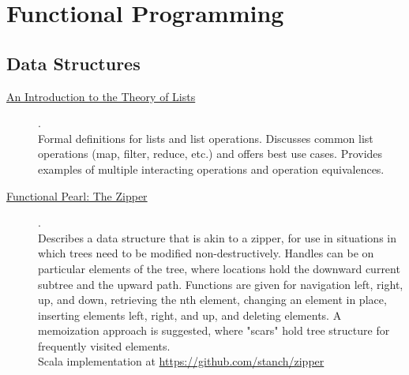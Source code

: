 \chapter {Functional Programming}

\section{Data Structures}

\begin{description}
    \item[\href{https://www.cs.ox.ac.uk/files/3378/PRG56.pdf}{An Introduction to the Theory of Lists}] {\cite{bird1987introduction}.
          \\ Formal definitions for lists and list operations. Discusses common list operations (map, filter, reduce, etc.) and offers best use cases. Provides examples of multiple interacting operations and operation equivalences.
          \\ }
    \item[\href{https://www.st.cs.uni-saarland.de/edu/seminare/2005/advanced-fp/docs/huet-zipper.pdf}{Functional Pearl: The Zipper}] {\cite{huet1997zipper}.
          \\ Describes a data structure that is akin to a zipper, for use in situations in which trees need to be modified non-destructively. Handles can be on particular elements of the tree, where locations hold the downward current subtree and the upward path. Functions are given for navigation left, right, up, and down, retrieving the nth element, changing an element in place, inserting elements left, right, and up, and deleting elements. A memoization approach is suggested, where "scars" hold tree structure for frequently visited elements.
          \\ Scala implementation at \href{https://github.com/stanch/zipper}{https://github.com/stanch/zipper}
          \\ }
\end{description}
